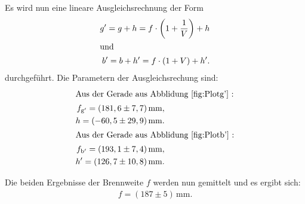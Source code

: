 Es wird nun eine lineare Ausgleichsrechnung der Form %
\begin{align}
  g'=g+h=f\cdot \left(1+\frac{1}{V}\right)+h \label{eqn:abbeg}\\
  \intertext{und}
  b'=b+h'=f\cdot \left(1+V\right)+h'. \label{eqn:abbeb}
\end{align}
durchgeführt.
Die Parametern der
Ausgleichsrechung  sind:
\begin{align*}
\intertext{Aus der Gerade aus Abblidung \ref{fig:Plotg'} :}
  f_\mathrm{g'}=(181,6\pm7,7)\,\si{\milli\meter}, \\
  h=(-60,5\pm29,9)\,\si{\milli\meter}. \\
\intertext{Aus der Gerade aus Abblidung \ref{fig:Plotb'} :}
f_\mathrm{b'}=(193,1\pm7,4)\,\si{\milli\meter}, \\
    h'=(126,7\pm10,8)\,\si{\milli\meter}.\\
\end{align*}

Die beiden Ergebnisse der Brennweite $f$
werden nun gemittelt und es ergibt sich:
\begin{align*}
  f=(187\pm5)\,\si{\milli\meter}.
\end{align*}
